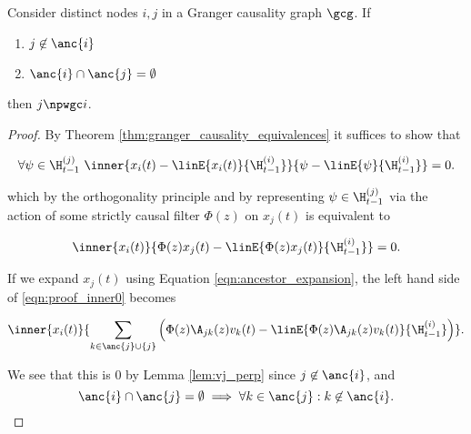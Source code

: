\begin{proposition}
  \label{prop:ancestor_uncorrelated}
  Consider distinct nodes $i, j$ in a Granger causality graph $\gcg$.
  If

  \begin{enumerate}[label=(\alph*)]
  \item{$j \not\in \anc{i}$}
  \item{$\anc{i}\cap\anc{j} = \emptyset$}
  \end{enumerate}

  then $j \npwgc i$.
\end{proposition}
\begin{proof}
  By Theorem \ref{thm:granger_causality_equivalences} it suffices to show that

  \begin{equation*}
    \forall \psi \in \H_{t - 1}^{(j)}\ \inner{x_i(t) - \linE{x_i(t)}{\H_{t - 1}^{(i)}}}{\psi - \linE{\psi}{\H_{t - 1}^{(i)}}} = 0.
  \end{equation*}

  which by the orthogonality principle and by representing
  $\psi \in \H_{t - 1}^{(j)}$ via the action of some strictly causal filter
  $\Phi(z)$ on $x_j(t)$ is equivalent to

  \begin{equation}
    \label{eqn:proof_inner0}
    \inner{x_i(t)}{\Phi(z)x_j(t) - \linE{\Phi(z)x_j(t)}{\H_{t - 1}^{(i)}}} = 0.
  \end{equation}

  If we expand $x_j(t)$ using Equation \eqref{eqn:ancestor_expansion},
  the left hand side of \eqref{eqn:proof_inner0} becomes

  \begin{equation*}
    \inner{x_i(t)}{\sum_{k \in \anc{j} \cup \{j\}} \Big(\Phi(z)\A_{jk}(z)v_k(t) - \linE{\Phi(z)\A_{jk}(z)v_k(t)}{\H_{t - 1}^{(i)}}\Big)}.
  \end{equation*}

  We see that this is $0$ by Lemma \ref{lem:vj_perp} since
  $j \not \in \anc{i}$, and
  \[
    \anc{i} \cap \anc{j} = \emptyset \implies \forall k \in \anc{j}: k \not \in \anc{i}.
  \]
\end{proof}

